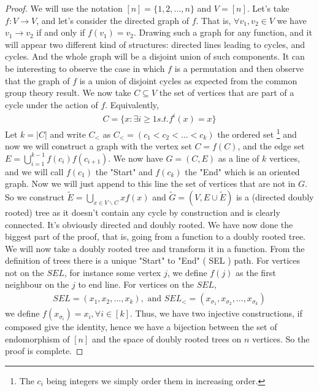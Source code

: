 \begin{proof}
We will use the notation $[n] = \{1, 2, ..., n\}$ and $V = [n]$.
Let's take $f:V \longrightarrow V$, and let's consider the directed graph of $f$. That is, $\forall v_1, v_2 \in V$ we have $v_1 \rightarrow v_2$ if and only if $f(v_1) = v_2$.
Drawing such a graph for any function, and it will appear two different kind of structures: directed lines leading to cycles, and cycles. 
And the whole graph will be a disjoint union of such components.
It can be interesting to observe the case in which $f$ is a permutation and then observe that the graph of $f$ is a union of disjoint cycles as expected from the common group theory result.
\newline
We now take $C \subseteq V$ the set of vertices that are part of a cycle under the action of $f$. Equivalently,
\begin{align*}
    C = \{ x : \exists i \geq 1 s. t. f^i(x) = x \}
\end{align*}
Let $k = |C|$ and write $C_<$ as $C_< = (c_1 < c_2 <...<c_k)$ the ordered set 
\footnote{The $c_i$ being integers we simply order them in increasing order.}
and now we will construct a graph with the vertex set $C = f(C)$, and the edge set $E = \bigcup_{i=1}^{k-1} f(c_i)f(c_{i+1})$. We now have $G=(C, E)$ as a line of $k$ vertices, and we will call $f(c_1)$ the "Start" and $f(c_k)$ the "End" which is an oriented graph.
\newline
Now we will just append to this line the set of vertices that are not in $G$. So we construct $\tilde{E} = \bigcup_{x \in V \backslash C} x f(x)$ and $\tilde{G} = (V, E\cup\tilde{E})$ is a (directed doubly rooted) tree as it doesn't contain any cycle by construction and is clearly connected. It's obviously directed and  doubly rooted.
We have now done the biggest part of the proof, that is, going from a function to a doubly rooted tree.
\newline
We will now take a doubly rooted tree and transform it in a function. From the definition of trees there is a unique "Start" to "End" ( SEL ) path.
\newline
For vertices not on the $SEL$, for instance some vertex $j$, we define $f(j)$ as the first neighbour on the $j$ to end line.
\newline
For vertices on the $SEL$, 
\begin{align}
	SEL = (x_1, x_2, ..., x_k), \text{ and } SEL_< = (x_{\sigma_1}, x_{\sigma_2}, ..., x_{\sigma_k}) 
\end{align}
we define $f(x_{\sigma_i}) = x_i, \forall i \in [k]$.
\newline
Thus, we have two injective constructions, if composed give the identity, hence we have a bijection between the set of endomorphism of $[n]$ and the space of doubly rooted trees on $n$ vertices. So the proof is complete.
\end{proof}
